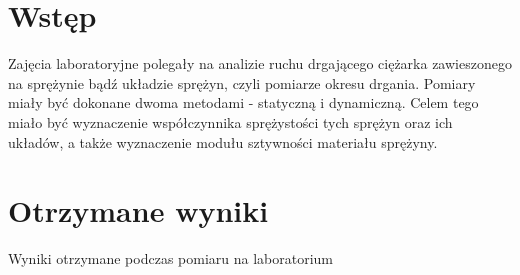 \documentclass[11pt,a4paper]{article}
\begin{document}
\newcommand{\ltabname}{Masa ciężarków[g]}
\newcommand{\rtabname}{Wydłużenie[cm]}
\newcommand{\rrtabname}{Czas wykonania 20 wahań[s]}
\newcommand{\Ts}{T[s]}
\newcommand{\pgfmath}[1]{\pgfmathparse{#1}\pgfmathresult}


    \section{Wstęp}
    Zajęcia laboratoryjne polegały na analizie ruchu drgającego ciężarka zawieszonego na sprężynie bądź układzie sprężyn, czyli pomiarze okresu drgania. Pomiary miały być dokonane dwoma metodami - statyczną i dynamiczną. Celem tego miało być wyznaczenie współczynnika sprężystości tych sprężyn oraz ich układów, a także wyznaczenie modułu sztywności materiału sprężyny.

    
    \section{Otrzymane wyniki}
    Wyniki otrzymane podczas pomiaru na laboratorium \\
    
\end{document}
